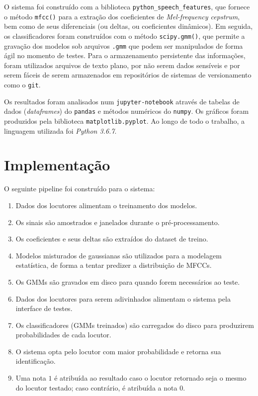 \documentclass[12pt]{diazessay} %
\begin{document}
O sistema foi construído com a biblioteca \texttt{python\_speech\_features}, que fornece o método \texttt{mfcc()} para a extração dos coeficientes de \emph{Mel-frequency cepstrum}, bem como de seus diferenciais (ou deltas, ou coeficientes dinâmicos).
Em seguida, os classificadores foram construídos com o método \texttt{scipy.gmm()}, que permite a gravação dos modelos sob arquivos \texttt{.gmm} que podem ser manipulados de forma ágil no momento de testes.
Para o armazenamento persistente das informações, foram utilizados arquivos de texto plano, por não serem dados sensíveis e por serem fáceis de serem armazenados em repositórios de sistemas de versionamento como o \texttt{git}.

Os resultados foram analisados num \texttt{jupyter-notebook} através de tabelas de dados (\emph{dataframes}) do \texttt{pandas} e métodos numéricos do \texttt{numpy}.
Os gráficos foram produzidos pela biblioteca \texttt{matplotlib.pyplot}.
Ao longo de todo o trabalho, a linguagem utilizada foi \emph{Python 3.6.7}.


\section*{Implementação}

O seguinte pipeline foi construído para o sistema:

\begin{enumerate}
	\item Dados dos locutores alimentam o treinamento dos modelos.
	\item Os sinais são amostrados e janelados durante o pré-processamento.
	\item Os coeficientes e seus deltas são extraídos do dataset de treino.
	\item Modelos misturados de gaussianas são utilizados para a modelagem estatística, de forma a tentar predizer a distribuição de MFCCs.
	\item Os GMMs são gravados em disco para quando forem necessários ao teste.
	\item Dados dos locutores para serem adivinhados alimentam o sistema pela interface de testes.
	\item Os classificadores (GMMs treinados) são carregados do disco para produzirem probabilidades de cada locutor.
	\item O sistema opta pelo locutor com maior probabilidade e retorna sua identificação.
	\item Uma nota $1$ é atribuída ao resultado caso o locutor retornado seja o mesmo do locutor testado; caso contrário, é atribuída a nota $0$. 
\end{enumerate}
\end{document}
